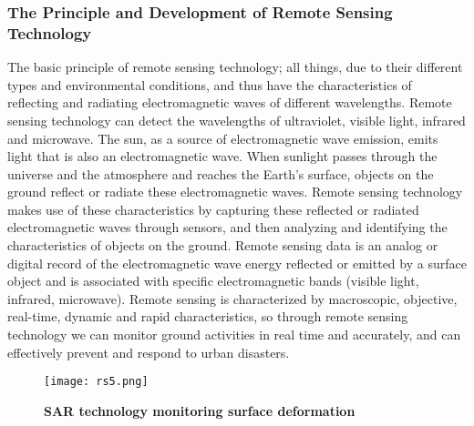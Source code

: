 \documentclass[conference]{IEEEtran}
\begin{document}
\subsubsection{The Principle and Development of Remote Sensing Technology}

The basic principle of remote sensing technology; all things, due to their different types and environmental conditions, and thus have the characteristics of reflecting and radiating electromagnetic waves of different wavelengths. Remote sensing technology can detect the wavelengths of ultraviolet, visible light, infrared and microwave. The sun, as a source of electromagnetic wave emission, emits light that is also an electromagnetic wave. When sunlight passes through the universe and the atmosphere and reaches the Earth's surface, objects on the ground reflect or radiate these electromagnetic waves. Remote sensing technology makes use of these characteristics by capturing these reflected or radiated electromagnetic waves through sensors, and then analyzing and identifying the characteristics of objects on the ground. Remote sensing data is an analog or digital record of the electromagnetic wave energy reflected or emitted by a surface object and is associated with specific electromagnetic bands (visible light, infrared, microwave). Remote sensing is characterized by macroscopic, objective, real-time, dynamic and rapid characteristics, so through remote sensing technology we can monitor ground activities in real time and accurately, and can effectively prevent and respond to urban disasters. 

\begin{figure}[h]
    \centering
    \texttt{[image: rs5.png]}
    \caption{\textbf{SAR technology monitoring surface deformation}}
    \label{fig:enter-label}
\end{figure}
\end{document}
